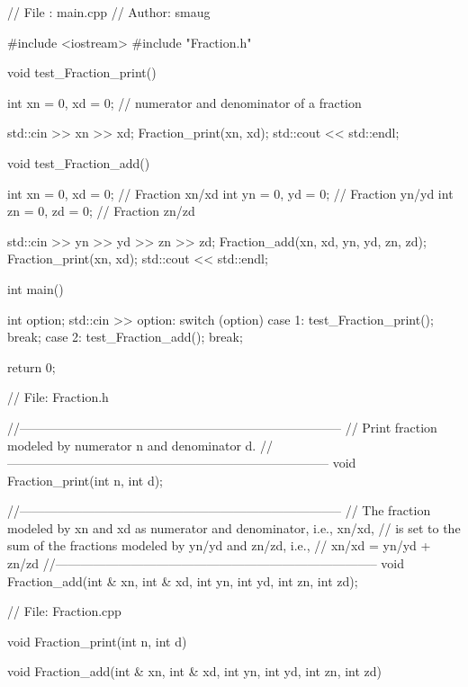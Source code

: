 {\small
\begin{console}
// File  : main.cpp
// Author: smaug

#include <iostream>
#include "Fraction.h"

void test_Fraction_print()
{
    int xn = 0, xd = 0; // numerator and denominator of a fraction

    std::cin >> xn >> xd;
    Fraction_print(xn, xd);
    std::cout << std::endl;
}


void test_Fraction_add()
{
    int xn = 0, xd = 0; // Fraction xn/xd
    int yn = 0, yd = 0; // Fraction yn/yd
    int zn = 0, zd = 0; // Fraction zn/zd

    std::cin >> yn >> yd >> zn >> zd;
    Fraction_add(xn, xd, yn, yd, zn, zd);
    Fraction_print(xn, xd);
    std::cout << std::endl;
}


int main()
{
    int option;
    std::cin >> option:
    switch (option)
    {
        case 1:
            test_Fraction_print();
            break;
        case 2:
            test_Fraction_add();
            break;
    }
    
    return 0;
}

\end{console}
\begin{console}
// File: Fraction.h

//-----------------------------------------------------------------------------
// Print fraction modeled by numerator n and denominator d.
//-----------------------------------------------------------------------------
void Fraction_print(int n, int d);

//-----------------------------------------------------------------------------
// The fraction modeled by xn and xd as numerator and denominator, i.e., xn/xd,
// is set to the sum of the fractions modeled by yn/yd and zn/zd, i.e.,
// xn/xd = yn/yd + zn/zd 
//-----------------------------------------------------------------------------
void Fraction_add(int & xn, int & xd,
                  int yn, int yd,
                  int zn, int zd);
\end{console}
\begin{console}
// File: Fraction.cpp

void Fraction_print(int n, int d)
{
}


void Fraction_add(int & xn, int & xd,
                  int yn, int yd,
                  int zn, int zd)
{
}
\end{console}
}






